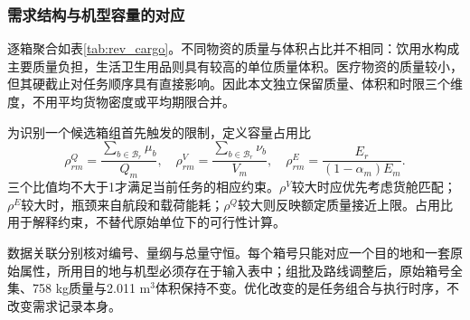\subsubsection{需求结构与机型容量的对应}
逐箱聚合如表\ref{tab:rev_cargo}。不同物资的质量与体积占比并不相同：饮用水构成主要质量负担，生活卫生用品则具有较高的单位质量体积。医疗物资的质量较小，但其硬截止对任务顺序具有直接影响。因此本文独立保留质量、体积和时限三个维度，不用平均货物密度或平均期限合并。


为识别一个候选箱组首先触发的限制，定义容量占用比
\begin{equation}
 \rho_{rm}^{Q}=\frac{\sum_{b\in\mathcal B_r}\mu_b}{Q_m},\quad
 \rho_{rm}^{V}=\frac{\sum_{b\in\mathcal B_r}\nu_b}{V_m},\quad
 \rho_{rm}^{E}=\frac{E_r}{(1-\alpha_m)E_m}.
 \label{eq:dimensionless_capacity}
\end{equation}
三个比值均不大于1才满足当前任务的相应约束。$\rho^V$较大时应优先考虑货舱匹配；$\rho^E$较大时，瓶颈来自航段和载荷能耗；$\rho^Q$较大则反映额定质量接近上限。占用比用于解释约束，不替代原始单位下的可行性计算。

数据关联分别核对编号、量纲与总量守恒。每个箱号只能对应一个目的地和一套原始属性，所用目的地与机型必须存在于输入表中；组批及路线调整后，原始箱号全集、758 kg质量与2.011 m$^3$体积保持不变。优化改变的是任务组合与执行时序，不改变需求记录本身。
